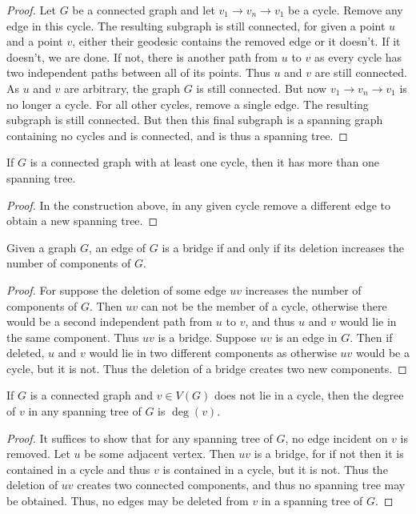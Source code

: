         \begin{proof}
        Let $G$ be a connected graph and let $v_1 \rightarrow v_n\rightarrow v_1$ be a cycle. Remove any edge in this cycle. The resulting subgraph is still connected, for given a point $u$ and a point $v$, either their geodesic contains the removed edge or it doesn't. If it doesn't, we are done. If not, there is another path from $u$ to $v$ as every cycle has two independent paths between all of its points. Thus $u$ and $v$ are still connected. As $u$ and $v$ are arbitrary, the graph $G$ is still connected. But now $v_1\rightarrow v_n \rightarrow v_1$ is no longer a cycle. For all other cycles, remove a single edge. The resulting subgraph is still connected. But then this final subgraph is a spanning graph containing no cycles and is connected, and is thus a spanning tree.
        \end{proof}
        \begin{corollary}
        If $G$ is a connected graph with at least one cycle, then it has more than one spanning tree.
        \end{corollary}
        \begin{proof}
        In the construction above, in any given cycle remove a different edge to obtain a new spanning tree.
        \end{proof}
        \begin{theorem}
        Given a graph $G$, an edge of $G$ is a bridge if and only if its deletion increases the number of components of $G$.
        \end{theorem}
        \begin{proof}
        For suppose the deletion of some edge $uv$ increases the number of components of $G$. Then $uv$ can not be the member of a cycle, otherwise there would be a second independent path from $u$ to $v$, and thus $u$ and $v$ would lie in the same component. Thus $uv$ is a bridge. Suppose $uv$ is an edge in $G$. Then if deleted, $u$ and $v$ would lie in two different components as otherwise $uv$ would be a cycle, but it is not. Thus the deletion of a bridge creates two new components.
        \end{proof}
        \begin{corollary}
        If $G$ is a connected graph and $v\in V(G)$ does not lie in a cycle, then the degree of $v$ in any spanning tree of $G$ is $\deg(v)$.
        \end{corollary}
        \begin{proof}
        It suffices to show that for any spanning tree of $G$, no edge incident on $v$ is removed. Let $u$ be some adjacent vertex. Then $uv$ is a bridge, for if not then it is contained in a cycle and thus $v$ is contained in a cycle, but it is not. Thus the deletion of $uv$ creates two connected components, and thus no spanning tree may be obtained. Thus, no edges may be deleted from $v$ in a spanning tree of $G$.
        \end{proof}
